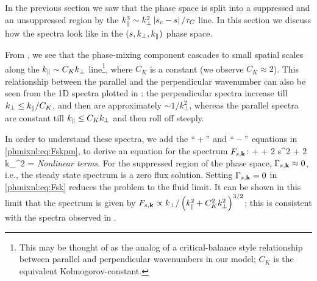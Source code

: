    In the previous section we saw that the phase space is split into a suppressed and an
   unsuppressed region by the $k_\parallel^3 \sim k_\perp^2 \left|s_c-s\right|/\tau_C$ line. In this
   section we discuss how the spectra look like in the $(s, k_\perp, k_\parallel)$ phase space. 

    From , we
    see that the phase-mixing component cascades to small spatial scales along the $k_\parallel
    \sim C_K k_\perp$ line\footnote{This may be thought of as the analog of a
    critical-balance style relationship between parallel and perpendicular wavenumbers in
    our model; $C_K$ is the equivalent Kolmogorov-constant.}, where $C_K$ is a constant (we observe $C_K\approx 2$). This
    relationship between the parallel and the perpendicular wavenumber can also be seen
    from the 1D spectra plotted in : the perpendicular
    spectra increase till $k_\perp \leq k_\parallel/C_K$, and then are approximately $\sim 1/k_\perp^2$,
    whereas the parallel spectra are constant till $k_\parallel \leq C_K k_\perp$ and then roll
    off steeply.

    In order to understand these spectra, we add the $``+"$ and $``-"$ equations in
    \eqref{phmixnl:eq:Fskpm}, to derive an equation for the spectrum $F_{s,\mathbf{k}}$:
    \bea
         +  + 2 \nu
        s^2 \Fsk + 2 \eta k_\perp^2 \Fsk =  
        \textit{Nonlinear terms}.
        \label{phmixnl:eq:Fsk}
    \eea
    For the suppressed region of the phase space, $\Gamma_{s,\mathbf{k}} \approx 0$, i.e., the steady state
    spectrum is a zero flux solution. Setting $\Gamma_{s,\mathbf{k}}=0$ in \eqref{phmixnl:eq:Fsk}
    reduces the problem to the fluid limit. It can be shown in this limit that the spectrum is given by $F_{s,\mathbf{k}}
    \propto k_\perp/\left(k_\parallel^2 + C_K^2 k_\perp^2\right)^{3/2}$; this is consistent with the
    spectra observed in . 

